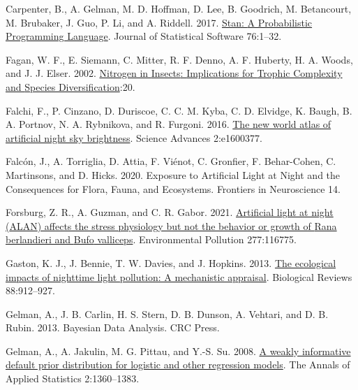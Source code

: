 \documentclass[
  12pt,
  letterpaper,
  DIV=11,
  numbers=noendperiod]{scrartcl}
\newlength{\cslhangindent}
\newlength{\cslentryspacingunit} %
\newenvironment{CSLReferences}[2] %
 {%
  \setlength{\parindent}{0pt}
  \ifodd #1
  \let\oldpar\par
  \def\par{\hangindent=\cslhangindent\oldpar}
  \fi
  \setlength{\parskip}{#2\cslentryspacingunit}
 }%
 {}
\begin{document}
\begin{CSLReferences}{1}{0}
\leavevmode{}%
Carpenter, B., A. Gelman, M. D. Hoffman, D. Lee, B. Goodrich, M.
Betancourt, M. Brubaker, J. Guo, P. Li, and A. Riddell. 2017.
\href{https://doi.org/10.18637/jss.v076.i01}{Stan: {A Probabilistic
Programming Language}}. Journal of Statistical Software 76:1--32.

\leavevmode{}%
Fagan, W. F., E. Siemann, C. Mitter, R. F. Denno, A. F. Huberty, H. A.
Woods, and J. J. Elser. 2002.
\href{https://doi.org/10.1086/343879}{Nitrogen in {Insects}:
{Implications} for {Trophic Complexity} and {Species
Diversification}}:20.

\leavevmode{}%
Falchi, F., P. Cinzano, D. Duriscoe, C. C. M. Kyba, C. D. Elvidge, K.
Baugh, B. A. Portnov, N. A. Rybnikova, and R. Furgoni. 2016.
\href{https://doi.org/10.1126/sciadv.1600377}{The new world atlas of
artificial night sky brightness}. Science Advances 2:e1600377.

\leavevmode{}%
Falcón, J., A. Torriglia, D. Attia, F. Viénot, C. Gronfier, F.
Behar-Cohen, C. Martinsons, and D. Hicks. 2020. Exposure to {Artificial
Light} at {Night} and the {Consequences} for {Flora}, {Fauna}, and
{Ecosystems}. Frontiers in Neuroscience 14.

\leavevmode{}%
Forsburg, Z. R., A. Guzman, and C. R. Gabor. 2021.
\href{https://doi.org/10.1016/j.envpol.2021.116775}{Artificial light at
night ({ALAN}) affects the stress physiology but not the behavior or
growth of {Rana} berlandieri and {Bufo} valliceps}. Environmental
Pollution 277:116775.

\leavevmode{}%
Gaston, K. J., J. Bennie, T. W. Davies, and J. Hopkins. 2013.
\href{https://doi.org/10.1111/brv.12036}{The ecological impacts of
nighttime light pollution: A mechanistic appraisal}. Biological Reviews
88:912--927.

\leavevmode{}%
Gelman, A., J. B. Carlin, H. S. Stern, D. B. Dunson, A. Vehtari, and D.
B. Rubin. 2013. Bayesian {Data Analysis}. {CRC Press}.

\leavevmode{}%
Gelman, A., A. Jakulin, M. G. Pittau, and Y.-S. Su. 2008.
\href{https://doi.org/10.1214/08-AOAS191}{A weakly informative default
prior distribution for logistic and other regression models}. The Annals
of Applied Statistics 2:1360--1383.


\end{CSLReferences}
\end{document}
